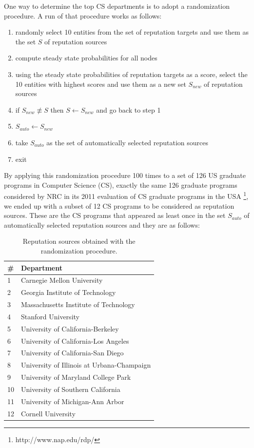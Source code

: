 \documentclass[man]{apa6}
\begin{document}
One way to determine the top CS departments is to 
adopt a randomization procedure. A run of that 
procedure works as follows: 
\begin{enumerate}
\item randomly select 10 entities from the set of reputation targets and use them as the set $S$ of reputation sources
\item compute steady state probabilities for all nodes
\item using the steady state probabilities of reputation targets as a score, select the 10 entities with highest scores and use them as a new set $S_{new}$ of reputation sources
\item if $S_{new} \not \equiv S$ then $S \leftarrow S_{new}$ and go back to step 1
\item $S_{auto} \leftarrow S_{new}$ 
\item take $S_{auto}$ as the set of automatically selected reputation sources
\item exit
\end{enumerate}
By applying this randomization procedure 100 times to a set of 126 US graduate programs in Computer Science (CS), 
exactly the same 126 graduate programs considered by NRC in its 2011 evaluation of CS graduate programs 
in the USA \footnote{http://www.nap.edu/rdp/}, we ended up with a subset of 12 CS programs to be considered as reputation sources. 
These are the CS programs that appeared as least once in the set $S_{auto}$ of automatically selected reputation 
sources and they are as follows: 

\begin{table}[h!]
 \centering
 \begin{tabular}{l l} 
 \toprule
 \# & Department \\ 
 \midrule
 1  & Carnegie Mellon University \\
 2  & Georgia Institute of Technology \\
 3  & Massachusetts Institute of Technology \\
 4  & Stanford University \\
 5  & University of California-Berkeley \\
 6  & University of California-Los Angeles \\
 7  & University of California-San Diego \\
 8  & University of Illinois at Urbana-Champaign \\
 9  & University of Maryland College Park \\
 10 & University of Southern California \\
 11 & University of Michigan-Ann Arbor \\
 12 & Cornell University \\
 \bottomrule
 \end{tabular}
 \caption{Reputation sources obtained with the randomization procedure.}
 \label{tab:departments}
\end{table}
\end{document}
